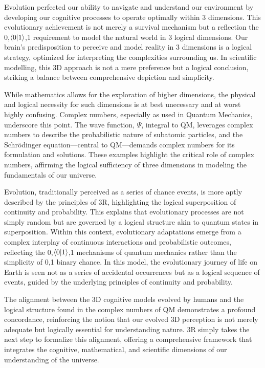 \documentclass[12pt]{article}
\begin{document}
Evolution perfected our ability to navigate and understand our environment by developing our cognitive processes to operate optimally within 3 dimensions. This evolutionary achievement is not merely a survival mechanism but a reflection the {0,\(\langle 0 | 1 \rangle\),1} requirement to model the natural world in 3 logical dimensions. Our brain's predisposition to perceive and model reality in 3 dimensions is a logical strategy, optimized for interpreting the complexities surrounding us. In scientific modelling, this 3D approach is not a mere preference but a logical conclusion, striking a balance between comprehensive depiction and simplicity.

While mathematics allows for the exploration of higher dimensions, the physical and logical necessity for such dimensions is at best unecessary and at worst highly confusing. Complex numbers, especially as used in Quantum Mechanics, underscore this point. The wave function, \(\Psi\), integral to QM, leverages complex numbers to describe the probabilistic nature of subatomic particles, and the Schrödinger equation—central to QM—demands complex numbers for its formulation and solutions. These examples highlight the critical role of complex numbers, affirming the logical sufficiency of three dimensions in modeling the fundamentals of our universe.

Evolution, traditionally perceived as a series of chance events, is more aptly described by the principles of 3R, highlighting the logical superposition of continuity and probability. This explains that evolutionary processes are not simply random but are governed by a logical structure akin to quantum states in superposition. Within this context, evolutionary adaptations emerge from a complex interplay of continuous interactions and probabilistic outcomes, reflecting the {0,\(\langle 0 | 1 \rangle\),1} mechanisms of quantum mechanics rather than the simplicity of {0,1} binary chance. In this model, the evolutionary journey of life on Earth is seen not as a series of accidental occurrences but as a logical sequence of events, guided by the underlying principles of continuity and probability.

The alignment between the 3D cognitive models evolved by humans and the logical structure found in the complex numbers of QM demonstrates a profound concordance, reinforcing the notion that our evolved 3D perception is not merely adequate but logically essential for understanding nature. 3R simply takes the next step to formalize this alignment, offering a comprehensive framework that integrates the cognitive, mathematical, and scientific dimensions of our understanding of the universe.
\end{document}
